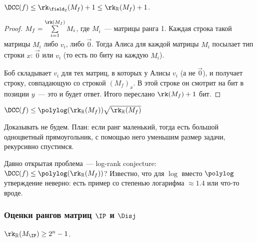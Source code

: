 \begin{theorem}
    $\DCC(f) \le \rk_{\field_2}(M_f) + 1 \le \rk_{\mathbb{R}}(M_f) + 1$.
\end{theorem}

\begin{proof}
    $M_f = \sum\limits^{\rk(M_f)}_{i = 1} M_i$, где $M_i$~--- матрицы ранга 1. Каждая строка такой
    матрицы $M_i$ либо $v_i$, либо $\vec 0$. Тогда Алиса для каждой матрицы $M_i$ посылает тип строки
    $x$: $\vec 0$ или $v_i$ (то есть по биту на каждую $M_i$).

    Боб складывает $v_i$ для тех матриц, в которых у Алисы $v_i$ (а не $\vec 0$), и получает строку,
    совпадающую со строкой $(M_f)_x$. В этой строке он смотрит на бит в позиции $y$~--- это и будет
    ответ. Итого переслано $\rk(M_f) + 1$ бит. 
\end{proof}

\begin{theorem}
    $\DCC(f) \le \polylog(\rk_{\mathbb{R}}(M_f)) \sqrt{\rk_{\mathbb{R}}(M_f)}$
\end{theorem}

Доказывать не будем. План: если ранг маленький, тогда есть большой одноцветный прямоугольник, с помощью
него уменьшим размер задачи, рекурсивно спустимся.

Давно открытая проблема~--- log-rank conjecture: $\DCC(f) \le \polylog(\rk_{\mathbb{R}}(M_f))$? Известно,
что для $\log$ вместо $\polylog$ утверждение неверно: есть пример со степенью логарифма $\approx 1.4$ или
что-то вроде.

\subsubsection{Оценки рангов матриц \texorpdfstring{$\IP$}{IP} и \texorpdfstring{$\Disj$}{DISJ}}

\begin{theorem}
    \label{th:rk(IP)-lower-bound}
    $\rk_{\mathbb{R}}(M_{\IP}) \ge 2^n - 1$.
\end{theorem}

